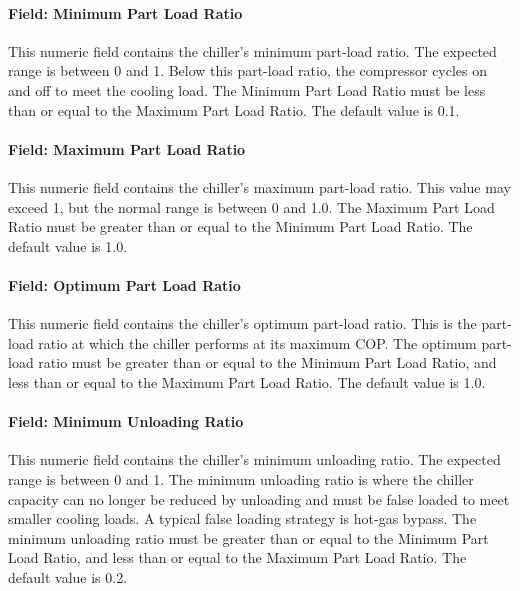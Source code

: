 \paragraph{Field: Minimum Part Load Ratio}\label{field-minimum-part-load-ratio-3}

This numeric field contains the chiller's minimum part-load ratio. The expected range is between 0 and 1. Below this part-load ratio, the compressor cycles on and off to meet the cooling load. The Minimum Part Load Ratio must be less than or equal to the Maximum Part Load Ratio. The default value is 0.1.

\paragraph{Field: Maximum Part Load Ratio}\label{field-maximum-part-load-ratio-3}

This numeric field contains the chiller's maximum part-load ratio. This value may exceed 1, but the normal range is between 0 and 1.0. The Maximum Part Load Ratio must be greater than or equal to the Minimum Part Load Ratio. The default value is 1.0.

\paragraph{Field: Optimum Part Load Ratio}\label{field-optimum-part-load-ratio-3}

This numeric field contains the chiller's optimum part-load ratio. This is the part-load ratio at which the chiller performs at its maximum COP. The optimum part-load ratio must be greater than or equal to the Minimum Part Load Ratio, and less than or equal to the Maximum Part Load Ratio. The default value is 1.0.

\paragraph{Field: Minimum Unloading Ratio}\label{field-minimum-unloading-ratio-000}

This numeric field contains the chiller's minimum unloading ratio. The expected range is between 0 and 1. The minimum unloading ratio is where the chiller capacity can no longer be reduced by unloading and must be false loaded to meet smaller cooling loads. A typical false loading strategy is hot-gas bypass. The minimum unloading ratio must be greater than or equal to the Minimum Part Load Ratio, and less than or equal to the Maximum Part Load Ratio. The default value is 0.2.

